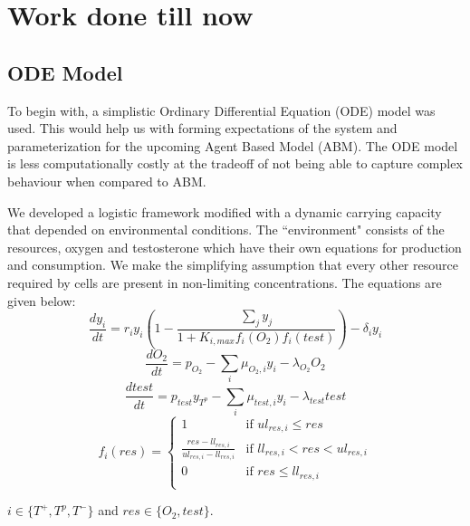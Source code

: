 \documentclass[11pt,a4paper]{article}
\begin{document}
\section{Work done till now}
\subsection{ODE Model}
To begin with, a simplistic Ordinary Differential Equation (ODE) model was used. This would help us with forming expectations of the system and parameterization for the upcoming Agent Based Model (ABM). The ODE model is less computationally costly at the tradeoff of not being able to capture complex behaviour when compared to ABM.

We developed a logistic framework \cite{Logistic} modified with a dynamic carrying capacity that depended on environmental conditions. The ``environment" consists of the resources, oxygen and testosterone which have their own equations for production and consumption. We make the simplifying assumption that every other resource required by cells are present in non-limiting concentrations. The equations are given below:
\begin{equation}
  \frac{dy_i}{dt} = r_i y_i (1 - \frac{\sum_j y_j}{1 + K_{i,max} f_i(O_2) f_i(test)} )- \delta_i y_i
  \label{celleq}
\end{equation}
\begin{equation}
  \frac{dO_2}{dt} = p_{O_2} - \sum_i \mu_{O_2,i} y_i - \lambda_{O_2} O_2
  \label{o2eq}
\end{equation}
\begin{equation}
  \frac{dtest}{dt} = p_{test} y_{T^p} - \sum_i \mu_{test,i} y_i - \lambda_{test} test
  \label{testeq}
\end{equation}
\begin{equation}
  f_i(res) = \begin{cases}
    1 &\text{if } ul_{res,i} \leq res\\
    \frac{res-ll_{res,i}}{ul_{res,i}-ll_{res,i}} &\text{if } ll_{res,i} < res < ul_{res,i}\\
    0 &\text{if } res \leq ll_{res,i}\\
  \end{cases}
  \label{freseq}
\end{equation}

$i \in \{T^+,T^p,T^-\}$ and $res \in \{O_2,test\}$.
\end{document}
